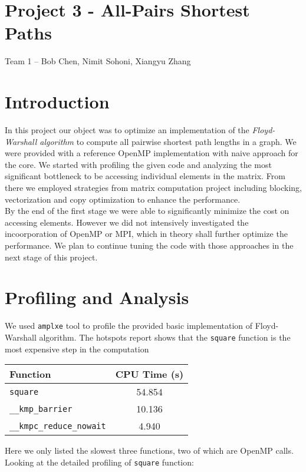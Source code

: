 \documentclass[12pt]{article}
\begin{document}
\setlength{\parindent}{24pt}


\section*{Project 3 - All-Pairs Shortest Paths}
Team 1 \--- Bob Chen, Nimit Sohoni, Xiangyu Zhang

\section{Introduction}
In this project our object was to optimize an implementation of the \textit{Floyd-Warshall algorithm} to compute all pairwise shortest path lengths in a graph. 
We were provided with a reference OpenMP implementation with naive approach for the core. We started with profiling the given code and analyzing the most significant bottleneck to be accessing individual elements in the matrix. From there we employed strategies from matrix computation project including blocking, vectorization and copy optimization to enhance the performance. \\
By the end of the first stage we were able to significantly minimize the cost on accessing elements. However we did not intensively investigated the incoorporation of OpenMP or MPI, which in theory shall further optimize the performance. We plan to continue tuning the code with those approaches in the next stage of this project.

\section{Profiling and Analysis}
We used \texttt{amplxe} tool to profile the provided basic implementation of Floyd-Warshall algorithm. The hotspots report shows that the \texttt{square} function is the most expensive step in the computation

\bigskip
\begin{center}
	\begin{tabular}{l|c}
		Function & CPU Time (s) \\ \hline
		\texttt{square} & 54.854 \\
		\texttt{\_\_kmp\_barrier} & 10.136 \\       
		\texttt{\_\_kmpc\_reduce\_nowait} & 4.940 \\  
	\end{tabular}
\end{center}

\bigskip
Here we only listed the slowest three functions, two of which are OpenMP calls. Looking at the detailed profiling of \texttt{square} function:
\end{document}
